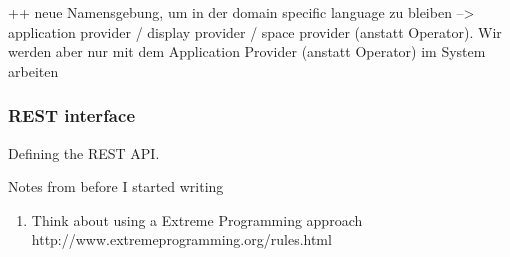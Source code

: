 ++ neue Namensgebung, um in der domain specific language zu bleiben --> application provider / display provider / space provider (anstatt Operator). Wir werden aber nur mit dem Application Provider (anstatt Operator) im System arbeiten





\subsubsection{REST interface}

Defining the REST API. 


Notes from before I started writing
\begin{enumerate}
\item Think about using a Extreme Programming approach http://www.extremeprogramming.org/rules.html
\end{enumerate}